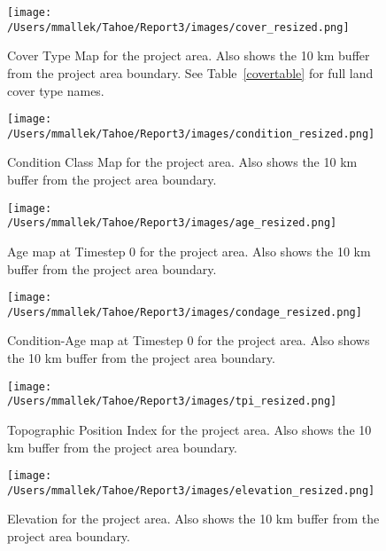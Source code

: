 \begin{figure}[!htbp]
\centering
\texttt{[image: /Users/mmallek/Tahoe/Report3/images/cover\_resized.png]}
\caption{Cover Type Map for the project area. Also shows the 10 km buffer from the project area boundary. See Table~\ref{covertable} for full land cover type names.}
\label{covermap}
\end{figure}

\begin{figure}[!htbp]
\centering
\texttt{[image: /Users/mmallek/Tahoe/Report3/images/condition\_resized.png]}
\caption{Condition Class Map for the project area. Also shows the 10 km buffer from the project area boundary.} 
\label{conditionmap}
\end{figure}

\begin{figure}[htbp]
\centering
\texttt{[image: /Users/mmallek/Tahoe/Report3/images/age\_resized.png]}
\caption{Age map at Timestep 0 for the project area. Also shows the 10 km buffer from the project area boundary.} 
\label{agemap}
\end{figure}

\begin{figure}[htbp]
\centering
\texttt{[image: /Users/mmallek/Tahoe/Report3/images/condage\_resized.png]}
\caption{Condition-Age map at Timestep 0 for the project area. Also shows the 10 km buffer from the project area boundary.} 
\label{condagemap}
\end{figure}

\begin{figure}[htbp]
\centering
\texttt{[image: /Users/mmallek/Tahoe/Report3/images/tpi\_resized.png]}
\caption{Topographic Position Index for the project area. Also shows the 10 km buffer from the project area boundary.} 
\label{tpimap}
\end{figure}

\begin{figure}[htbp]
\centering
\texttt{[image: /Users/mmallek/Tahoe/Report3/images/elevation\_resized.png]}
\caption{Elevation for the project area. Also shows the 10 km buffer from the project area boundary.} 
\label{elevationmap}
\end{figure}


